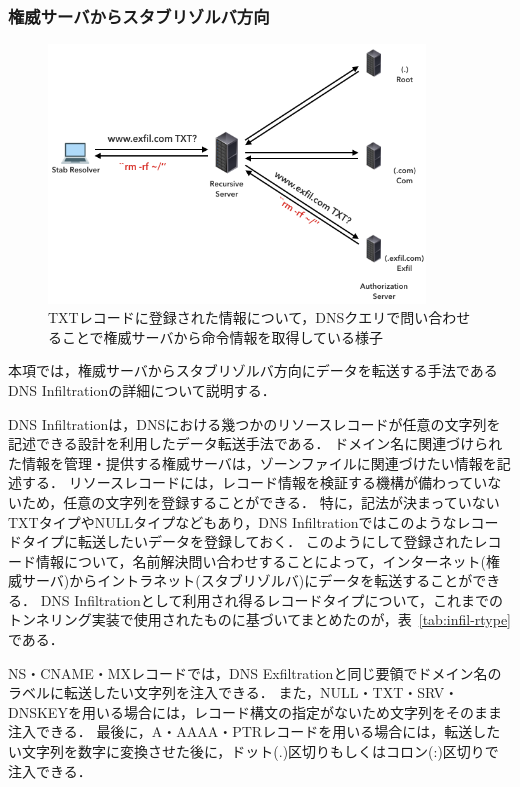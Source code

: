 \subsubsection{権威サーバからスタブリゾルバ方向}
\label{sec:dns-infiltration}

\begin{figure}[h]
 \centering
 \includegraphics[width=10.0cm]{figure/dns-infiltration.png}
 \caption{TXTレコードに登録された情報について，DNSクエリで問い合わせることで権威サーバから命令情報を取得している様子}
 \label{fig:dns-infiltration}
\end{figure}

本項では，権威サーバからスタブリゾルバ方向にデータを転送する手法であるDNS Infiltrationの詳細について説明する．

DNS Infiltrationは，DNSにおける幾つかのリソースレコードが任意の文字列を記述できる設計を利用したデータ転送手法である．
ドメイン名に関連づけられた情報を管理・提供する権威サーバは，ゾーンファイルに関連づけたい情報を記述する．
リソースレコードには，レコード情報を検証する機構が備わっていないため，任意の文字列を登録することができる．
特に，記法が決まっていないTXTタイプやNULLタイプなどもあり，DNS Infiltrationではこのようなレコードタイプに転送したいデータを登録しておく．
このようにして登録されたレコード情報について，名前解決問い合わせすることによって，インターネット(権威サーバ)からイントラネット(スタブリゾルバ)にデータを転送することができる．
DNS Infiltrationとして利用され得るレコードタイプについて，これまでのトンネリング実装で使用されたものに基づいてまとめたのが，表~\ref{tab:infil-rtype}である．


NS・CNAME・MXレコードでは，DNS Exfiltrationと同じ要領でドメイン名のラベルに転送したい文字列を注入できる．
また，NULL・TXT・SRV・DNSKEYを用いる場合には，レコード構文の指定がないため文字列をそのまま注入できる．
最後に，A・AAAA・PTRレコードを用いる場合には，転送したい文字列を数字に変換させた後に，ドット(.)区切りもしくはコロン(:)区切りで注入できる．

